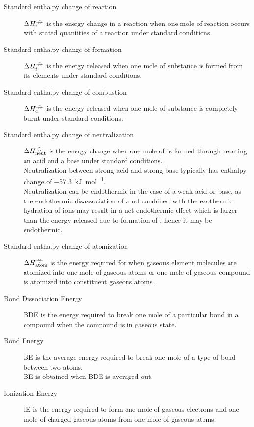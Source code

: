 \documentclass[../main]{subfiles}
\begin{document}
	\begin{description}

		\item[Standard enthalpy change of reaction] \(\Delta H_\text{r}^{-\kern-4pt{\ominus}\kern-4pt-}\) is the energy change in a reaction when one mole of reaction occurs with stated quantities of a reaction under standard conditions.
		
		\item[Standard enthalpy change of formation] \(\Delta H_\text{f}^{-\kern-4pt{\ominus}\kern-4pt-}\) is the energy released when one mole of substance is formed from its elements under standard conditions.
		
		\item[Standard enthalpy change of combustion] \(\Delta H_\text{c}^{-\kern-4pt{\ominus}\kern-4pt-}\) is the energy released when one mole of substance is completely burnt under standard conditions.
		
		\item[Standard enthalpy change of neutralization] \(\Delta H_\text{neut}^{-\kern-4pt{\ominus}\kern-4pt-}\) is the energy change when one mole of  is formed through reacting an acid and a base under standard conditions. \\
		Neutralization between strong acid and strong base typically has enthalpy change of \SI{-57.3}{\kJ\per\mol}. \\
		Neutralization can be endothermic in the case of a weak acid or base, as the endothermic disassociation of  a nd  combined with the exothermic hydration of ions may result in a net endothermic effect which is larger than the energy released due to formation of , hence it may be endothermic.

		\item[Standard enthalpy change of atomization] \(\Delta H_\text{atom}^{-\kern-4pt{\ominus}\kern-4pt-}\) is the energy required for when gaseous element molecules are atomized into one mole of gaseous atoms or one mole of gaseous compound is atomized into constituent gaseous atoms.
		
		\item[Bond Dissociation Energy] BDE is the energy required to break one mole of a particular bond in a compound when the compound is in gaseous state.
		
		\item[Bond Energy] BE is the average energy required to break one mole of a type of bond between two atoms. \\
		BE is obtained when BDE is averaged out.
		
		\item[Ionization Energy] IE is the energy required to form one mole of gaseous electrons and one mole of charged gaseous atoms from one mole of gaseous atoms.
		

\end{description}
\end{document}
